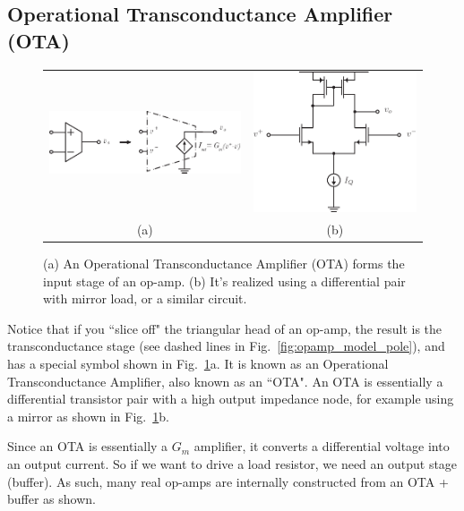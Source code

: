 \subsection{Operational Transconductance Amplifier (OTA)}

\begin{figure}[tb]
\begin{center}
\begin{tabular}{cc}
\includegraphics[scale=1.25]{OTA} &
\includegraphics[width=.35\columnwidth]{Diffpair_se_output.pdf} \\
(a) & (b) \\
\end{tabular}
\end{center}
\caption{(a) An Operational Transconductance Amplifier (OTA) forms the input stage of an op-amp.  (b) It's realized using a differential pair with mirror load, or a similar circuit.} \label{fig:OTA}
\end{figure}

Notice that if you ``slice off" the triangular head of an op-amp, the result is the transconductance stage (see dashed lines in Fig.~\ref{fig:opamp_model_pole}), and has a special symbol shown in Fig.~\ref{fig:OTA}a.  It is known as an Operational Transconductance Amplifier, also known as an ``OTA".  An OTA is essentially a differential transistor pair with a high output impedance node, for example using a mirror as shown in Fig.~\ref{fig:OTA}b.
 
Since an OTA is essentially a $G_m$ amplifier, it converts a differential voltage into an output current.  So if we want to drive a load resistor, we need an output stage (buffer).  As such, many real op-amps are internally constructed from an OTA + buffer as shown.
 

